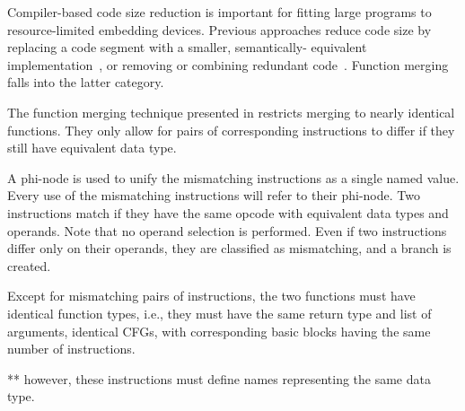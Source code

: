 
Compiler-based code size reduction is important for fitting large programs to resource-limited embedding devices. Previous approaches reduce code size by replacing a code segment with a smaller, semantically- equivalent implementation~\cite{massalin87,tanenbaum82}, or removing or combining redundant
code~\cite{cocke70,knoop94,ernst97,cooper99,debray00,chen03,loki04}. Function merging falls into the latter category. 


The function merging technique presented in \cite{edler14} restricts merging to nearly identical functions. They only allow for pairs of corresponding instructions to differ if they still have equivalent data type.


A phi-node is used to unify the mismatching instructions as a single named value.
Every use of the mismatching instructions will refer to their phi-node.
Two instructions match if they have the same opcode with equivalent data types and operands.
Note that no operand selection is performed.
Even if two instructions differ only on their operands, they are classified as mismatching, and a branch is created.


Except for mismatching pairs of instructions, the two functions must have identical function types, i.e., they must have the same return type and list of arguments, identical CFGs, with corresponding basic blocks having the same number of instructions.

** however, these instructions must define names representing the same data type.



